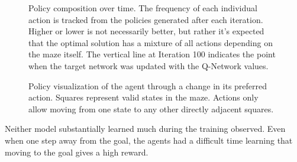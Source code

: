\documentclass[12pt]{article}
\begin{document}
\begin{figure}[h]
	\begin{center}
		
	\end{center}
	\caption{Policy composition over time. The frequency of each individual action is tracked from the policies generated after each iteration. Higher or lower is not necessarily better, but rather it's expected that the optimal solution has a mixture of all actions depending on the maze itself. The vertical line at Iteration 100 indicates the point when the target network was updated with the Q-Network values.}
	\label{fig:directional}
\end{figure}

\begin{figure}[h]
	\begin{center}
		\begin{subfigure}{0.4\linewidth}
			
			\label{fig:policy_350}
		\end{subfigure}
		\hspace{0.1in}
		\begin{subfigure}{0.4\linewidth}
			
			\label{fig:policy_400}
		\end{subfigure}
	\end{center}
	\begin{center}
		\begin{subfigure}{0.4\linewidth}
			
			\label{fig:policy_450}
		\end{subfigure}
		\hspace{0.1in}
		\begin{subfigure}{0.4\linewidth}
			
			\label{fig:policy_500}
		\end{subfigure}
	\end{center}
	\caption{Policy visualization of the agent through a change in its preferred action. Squares represent valid states in the maze. Actions only allow moving from one state to any other directly adjacent squares.}
	\label{fig:policy}
\end{figure}


Neither model substantially learned much during the training observed.
Even when one step away from the goal, the agents had a difficult time learning that moving to the goal gives a high reward.
\end{document}
